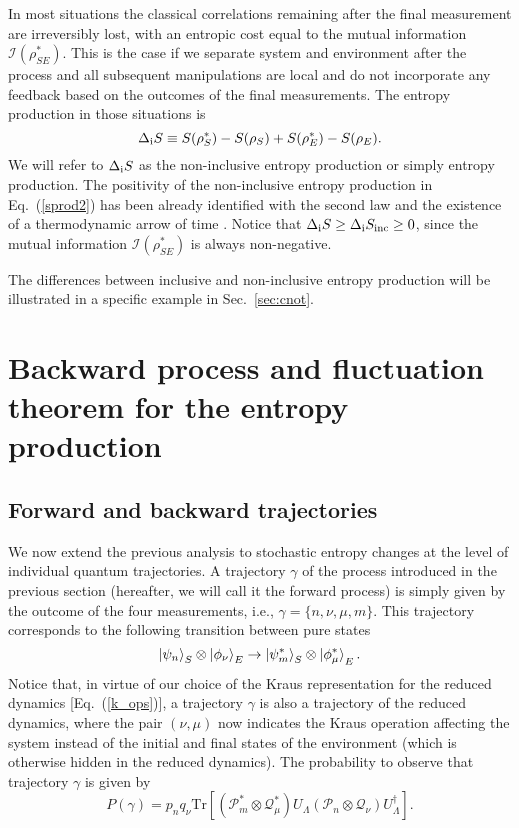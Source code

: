\documentclass[aps,prx,twocolumn,showpacs,floatfix,superscriptaddress,graphics,longbibliography]{revtex4-1}
\newcommand{\tr}{\mathrm{Tr}}
\newcommand{\HAT}{}
\begin{document}
In most situations the classical correlations remaining after the final measurement are irreversibly lost, with an entropic cost equal to the mutual information $\mathcal{I}(\rho_{SE}^\ast)$. 
This is the case if we separate system and environment after the process and all subsequent manipulations are local and do not incorporate any feedback based on the outcomes of the final measurements. 
The entropy production in those situations is
\begin{equation}\label{sprod2}
\Delta_{\rm i} S \equiv S(\rho_{S}^\ast) - S(\rho_{S}) +  S(\rho_{E}^\ast) - S(\rho_{E}).
\end{equation}
We will refer to $\Delta_{\rm i} S$ as the non-inclusive entropy production or simply entropy production. The positivity of the non-inclusive entropy production in Eq.~(\ref{sprod2}) has been 
already identified with the second law \cite{ReebWolf} and the existence of a thermodynamic arrow of time \cite{Par08, Jen10}. Notice that $\Delta_{\rm i} S \geq \Delta_{\rm i} S_{\rm inc} \geq 0$, 
since the mutual information $\mathcal{I}(\rho_{SE}^\ast) $ is always non-negative. 

The differences between inclusive and non-inclusive entropy production will be illustrated in a specific example in Sec.~\ref{sec:cnot}.
  
\section{Backward process and fluctuation theorem for the entropy production}\label{S-TotalEP}


\subsection{Forward and backward trajectories}

We now extend the previous analysis to stochastic entropy changes at the level of individual quantum trajectories. A trajectory $\gamma$ of the process introduced in the previous section (hereafter, we will call it the forward process) is simply given by the outcome of the four measurements, i.e.,  $\gamma = \{n,\nu,  \mu, m \}$. This trajectory corresponds to the following transition between pure states
\begin{equation}\label{qjumps}
 \ket{\psi_n}_S \otimes \ket{\phi_\nu}_E  \rightarrow \ket{\psi_m^{\ast}}_S  \otimes \ket{\phi_\mu^\ast}_E. 
\end{equation}
Notice that, in virtue of our choice of the Kraus representation for the reduced dynamics [Eq.~(\ref{k_ops})], a trajectory $\gamma$ is also a trajectory of the reduced dynamics, where the pair $(\nu,\mu)$ now indicates the Kraus operation affecting the system instead of the initial and final 
states of the environment (which is otherwise hidden in the reduced dynamics). 
The probability to observe that trajectory $\gamma$ is given by
\begin{equation}\label{m_pf}
P ({\gamma}) = p_n q_\nu \tr[(\HAT{\mathcal{P}}_m^{\ast} \otimes \HAT{\mathcal{Q}}_\mu^{\ast}) \HAT{U}_{\Lambda} (\HAT{\mathcal{P}}_n \otimes \HAT{\mathcal{Q}}_\nu) \HAT{U}_{\Lambda}^\dagger]. 
\end{equation}
\end{document}
